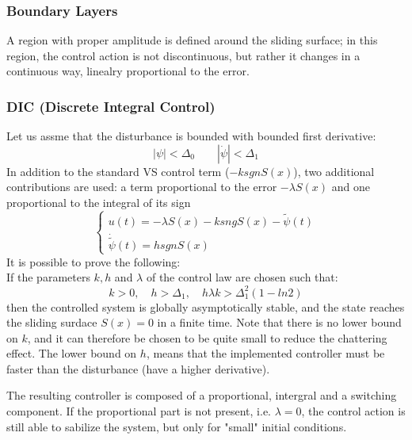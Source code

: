 \documentclass{book}
\begin{document}
\subsubsection{Boundary Layers}
A region with proper amplitude is defined around the sliding surface; in this region, the control action is not discontinuous, but rather it changes in a continuous way, linealry proportional to the error.
\subsubsection{DIC (Discrete Integral Control)}
Let us assme that the disturbance is bounded with bounded first derivative:
\[
    |\psi|<\Delta_0 \qquad |\dot{\psi}|<\Delta_1
\]
In addition to the standard VS control term ($-k sgnS(x)$), two additional contributions are used: a term proportional to the error $-\lambda S(x)$ and one proportional to the integral of its sign
\[
    \begin{cases}
        u(t) = -\lambda S(x) -ksngS(x)-\tilde{\psi}(t)\\
        \dot{\tilde{\psi}} (t) = h sgn S(x)
    \end{cases}
\]
It is possible to prove the following: \\
If the parameters $k,h$ and $\lambda$ of the control law are chosen such that:
\[
    k>0, \quad h>\Delta_1, \quad h\lambda k > \Delta_1^2(1-ln2)
\]
then the controlled system is globally asymptotically stable, and the state reaches the sliding surdace $S(x)=0$ in a finite time.
Note that there is no lower bound on $k$, and it can therefore be chosen to be quite small to reduce the chattering effect. The lower bound on $h$, means that the implemented controller must be faster than the disturbance (have a higher derivative). 

The resulting controller is composed of a proportional, intergral and a switching component. If the proportional part is not present, i.e. $\lambda = 0$, the control action is still able to sabilize the system, but only for "small" initial conditions. 
\end{document}
